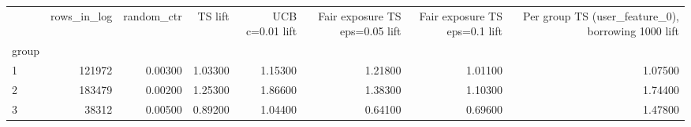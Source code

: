 \begin{tabular}{lrrrrrrr}
\toprule
 & rows\_in\_log & random\_ctr & TS lift & UCB c=0.01 lift & Fair exposure TS eps=0.05 lift & Fair exposure TS eps=0.1 lift & Per group TS (user\_feature\_0), borrowing 1000 lift \\
group &  &  &  &  &  &  &  \\
\midrule
1 & 121972 & 0.00300 & 1.03300 & 1.15300 & 1.21800 & 1.01100 & 1.07500 \\
2 & 183479 & 0.00200 & 1.25300 & 1.86600 & 1.38300 & 1.10300 & 1.74400 \\
3 & 38312 & 0.00500 & 0.89200 & 1.04400 & 0.64100 & 0.69600 & 1.47800 \\
\bottomrule
\end{tabular}
